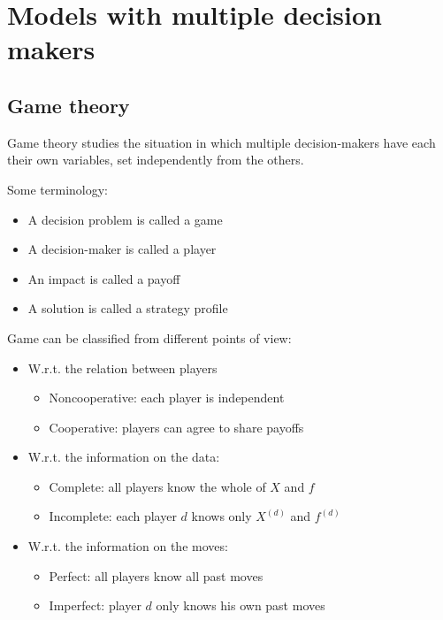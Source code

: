 \section{Models with multiple decision makers}

\subsection{Game theory}

Game theory studies the situation in which multiple decision-makers have each their own variables, set independently from the others.

Some terminology:
\begin{itemize}
	\item A decision problem is called a game
	
	\item A decision-maker is called a player 
	
	\item An impact is called a payoff
	
	\item A solution is called a strategy profile
\end{itemize}

Game can be classified from different points of view: 
\begin{itemize}
	\item W.r.t. the relation between players
	\begin{itemize}
		\item Noncooperative: each player is independent 
		
		\item Cooperative: players can agree to share payoffs
	\end{itemize}
	
	\item W.r.t. the information on the data:
	\begin{itemize}
		\item Complete: all players know the whole of $X$ and $f$
		
		\item Incomplete: each player $d$ knows only $X^{(d)}$ and $f^{(d)}$
	\end{itemize}
	
	\item W.r.t. the information on the moves:
	\begin{itemize}
		\item Perfect: all players know all past moves 
		
		\item Imperfect: player $d$ only knows his own past moves
	\end{itemize}
\end{itemize}

